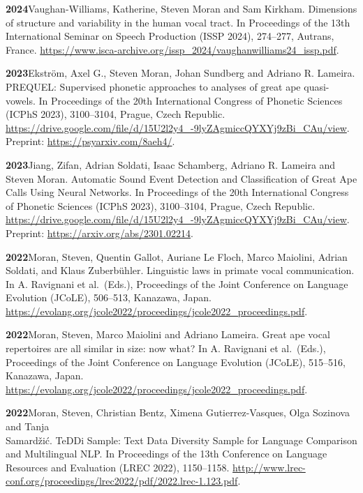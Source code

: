 \documentclass[11pt]{article}
\newcommand{\hangpara}{
 \setlength{\parindent}{0in} %
 \hangindent=0.42in %
}
\begin{document}
\vskip 6pt
\hangpara
{\bf 2024}\hspace{1ex}Vaughan-Williams, Katherine, Steven Moran and Sam Kirkham. Dimensions of structure and variability in the human vocal tract. In Proceedings of the 13th International Seminar on Speech Production (ISSP 2024), 274--277, Autrans, France. \url{https://www.isca-archive.org/issp_2024/vaughanwilliams24_issp.pdf}.

\vskip 6pt
\hangpara
{\bf 2023}\hspace{1ex}Ekstr{\"o}m, Axel G., Steven Moran, Johan Sundberg and Adriano R. Lameira. PREQUEL: Supervised phonetic approaches to analyses of great ape quasi-vowels. In Proceedings of the 20th International Congress of Phonetic Sciences (ICPhS 2023), 3100--3104, Prague, Czech Republic. \url{https://drive.google.com/file/d/15U2l2y4_-9lyZAgmiccQYXYj9zBi_CAu/view}. Preprint: \url{https://psyarxiv.com/8aeh4/}.

\vskip 6pt
\hangpara
{\bf 2023}\hspace{1ex}Jiang, Zifan, Adrian Soldati, Isaac Schamberg, Adriano R. Lameira and Steven Moran. Automatic Sound Event Detection and Classification of Great Ape Calls Using Neural Networks. In Proceedings of the 20th International Congress of Phonetic Sciences (ICPhS 2023), 3100--3104, Prague, Czech Republic. \url{https://drive.google.com/file/d/15U2l2y4_-9lyZAgmiccQYXYj9zBi_CAu/view}. Preprint: \url{https://arxiv.org/abs/2301.02214}.

\vskip 6pt
\hangpara
{\bf 2022}\hspace{1ex}Moran, Steven, Quentin Gallot, Auriane Le Floch, Marco Maiolini, Adrian Soldati, and Klaus Zuberbühler. Linguistic laws in primate vocal communication. In A. Ravignani et al.\ (Eds.), Proceedings of the Joint Conference on Language Evolution (JCoLE), 506--513, Kanazawa, Japan. \url{https://evolang.org/jcole2022/proceedings/jcole2022_proceedings.pdf}.

\vskip 6pt
 \hangpara
{\bf 2022}\hspace{1ex}Moran, Steven, Marco Maiolini and Adriano Lameira. Great ape vocal repertoires are all similar in size: now what?  In A. Ravignani et al.\ (Eds.), Proceedings of the Joint Conference on Language Evolution (JCoLE), 515--516, Kanazawa, Japan. \url{https://evolang.org/jcole2022/proceedings/jcole2022_proceedings.pdf}.

\vskip 6pt
 \hangpara
{\bf 2022}\hspace{1ex}Moran, Steven, Christian Bentz, Ximena Gutierrez-Vasques, Olga Sozinova and Tanja \\ Samardžić. TeDDi Sample: Text Data Diversity Sample for Language Comparison and Multilingual NLP. In Proceedings of the 13th Conference on Language Resources and Evaluation (LREC 2022), 1150--1158. \url{http://www.lrec-conf.org/proceedings/lrec2022/pdf/2022.lrec-1.123.pdf}.
\end{document}

